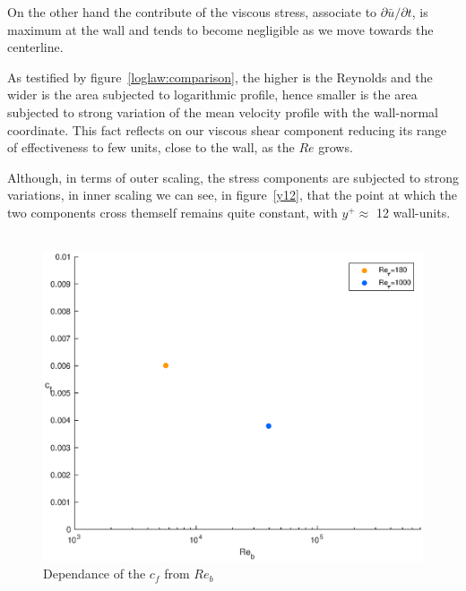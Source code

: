 On the other hand the contribute of the viscous stress, associate to $\partial{\bar{u}}/\partial{t}$, is maximum at the wall and tends to become negligible as we move towards the centerline. \par
As testified by figure~\ref{loglaw:comparison}, the higher is the Reynolds and the wider is the area subjected to logarithmic profile, hence smaller is the area subjected to strong variation of the mean velocity profile with the wall-normal coordinate. This fact reflects on our viscous shear component reducing its range of effectiveness to few units, close to the wall, as the $Re$ grows.\par
Although, in terms of outer scaling, the stress components are subjected to strong variations, in inner scaling we can see, in figure~\ref{y12}, that the point at which the two components cross themself remains quite constant, with $y^{+}\approx$ 12 wall-units. \\~\par


\begin{figure}
\begin{center}
\includegraphics[scale=0.55]{grafici/cf.eps}
\caption{Dependance of the $c_{f}$ from $Re_{b}$}
\label{cf}
\end{center}
\end{figure}


